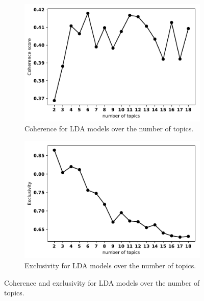 \documentclass{article}
\theoremstyle{definition}
\begin{document}
\begin{figure}[!hbtp]
    \centering
    \begin{subfigure}{.45\textwidth}
        \centering
        \includegraphics[width=\textwidth]{coherence_values.pdf}
        \caption{Coherence for LDA models over the number of topics.}
        \label{fig:coherence_value_over_number_of_topics}
    \end{subfigure}\hfill
    \begin{subfigure}{.45\textwidth}
        \centering
        \includegraphics[width=\textwidth]{exclusivity_values.pdf}
        \caption{Exclusivity for LDA models over the number of topics.}
        \label{fig:exclusivity_value_over_number_of_topics}
    \end{subfigure}
    \caption{Coherence and exclusivity for LDA models over the number of topics.}\label{figure:models_scores}
\end{figure}
\end{document}
